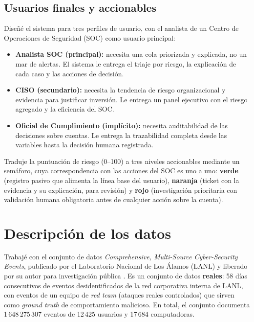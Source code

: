 \documentclass[12pt, a4paper]{article}
\begin{document}
\subsection{Usuarios finales y accionables}

Diseñé el sistema para tres perfiles de usuario, con el analista de un Centro de Operaciones de
Seguridad (SOC) como usuario principal:

\begin{itemize}[leftmargin=1.5cm]
  \item \textbf{Analista SOC (principal):} necesita una cola priorizada y explicada, no un mar de
        alertas. El sistema le entrega el triaje por riesgo, la explicación de cada caso y las
        acciones de decisión.
  \item \textbf{CISO (secundario):} necesita la tendencia de riesgo organizacional y evidencia para
        justificar inversión. Le entrega un panel ejecutivo con el riesgo agregado y la eficiencia
        del SOC.
  \item \textbf{Oficial de Cumplimiento (implícito):} necesita auditabilidad de las decisiones sobre
        cuentas. Le entrega la trazabilidad completa desde las variables hasta la decisión humana
        registrada.
\end{itemize}

Traduje la puntuación de riesgo (0--100) a tres niveles accionables mediante un semáforo, cuya
correspondencia con las acciones del SOC es uno a uno: \textbf{verde} (registro pasivo que alimenta
la línea base del usuario), \textbf{naranja} (ticket con la evidencia y su explicación, para
revisión) y \textbf{rojo} (investigación prioritaria con validación humana obligatoria antes de
cualquier acción sobre la cuenta).

\section{Descripción de los datos}

Trabajé con el conjunto de datos \textit{Comprehensive, Multi-Source Cyber-Security Events},
publicado por el Laboratorio Nacional de Los Álamos (LANL) y liberado por su autor para investigación
pública \cite{kent2015data, kent2015book}. Es un conjunto de datos \textbf{reales}: 58 días
consecutivos de eventos desidentificados de la red corporativa interna de LANL, con eventos de un
equipo de \textit{red team} (ataques reales controlados) que sirven como \textit{ground truth} de
comportamiento malicioso. En total, el conjunto documenta 1\,648\,275\,307 eventos de 12\,425
usuarios y 17\,684 computadoras.
\end{document}

